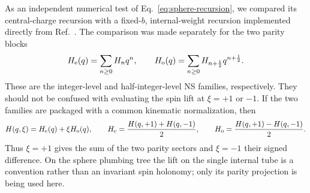 \documentclass[11pt]{article}
\begin{document}
As an independent numerical test of Eq.~\eqref{eq:sphere-recursion}, we
compared its central-charge recursion with a fixed-\(b\), internal-weight
recursion implemented directly from
Ref.~\cite{HadaszJaskolskiSuchanek2007NSBlocks}.  The comparison was made
separately for the two parity blocks
\begin{equation}
 H_{\rm e}(q)=\sum_{n\geq0}H_nq^n,
 \qquad
 H_{\rm o}(q)=\sum_{n\geq0}H_{n+\frac12}q^{n+\frac12}.
 \label{eq:sphere-even-odd-elliptic-blocks}
\end{equation}
These are the integer-level and half-integer-level NS families,
respectively.  They should not be confused with evaluating the spin lift at
\(\xi=+1\) or \(-1\).  If the two families are packaged with a common
kinematic normalization, then
\begin{equation}
 H(q,\xi)=H_{\rm e}(q)+\xi H_{\rm o}(q),
 \qquad
 H_{\rm e}=\frac{H(q,+1)+H(q,-1)}2,
 \qquad
 H_{\rm o}=\frac{H(q,+1)-H(q,-1)}2.
 \label{eq:sphere-xi-parity-projection}
\end{equation}
Thus \(\xi=+1\) gives the sum of the two parity sectors and \(\xi=-1\)
their signed difference.  On the sphere plumbing tree the lift on the
single internal tube is a convention rather than an invariant spin
holonomy; only its parity projection is being used here.
\end{document}
